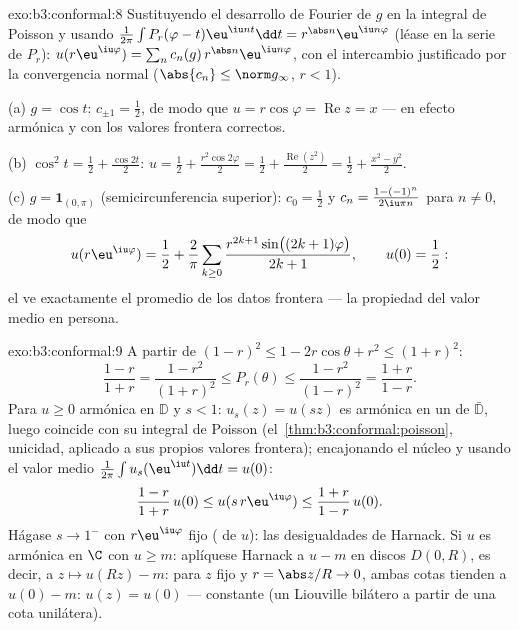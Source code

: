 \begin{solution}{exo:b3:conformal:8}
Sustituyendo el desarrollo de Fourier de $g$ en la integral de Poisson y
usando $\frac1{2\pi}\int P_r(\varphi - t)\eu^{\iu nt}\dd t =
r^{\abs n}\eu^{\iu n\varphi}$ (léase en la serie de $P_r$):
$u(r\eu^{\iu\varphi}) = \sum_nc_n(g)\,r^{\abs
n}\eu^{\iu n\varphi}$, con el intercambio justificado por la
convergencia normal ($\abs{c_n} \leq \norm g_\infty$, $r < 1$).

(a) $g = \cos t$: $c_{\pm1} = \frac12$, de modo que $u =
r\cos\varphi = \operatorname{Re}z = x$ --- en efecto armónica y con los
valores frontera correctos.

(b) $\cos^2t = \frac12 + \frac{\cos 2t}2$: $u = \frac12 +
\frac{r^2\cos2\varphi}2 = \frac12 +
\frac{\operatorname{Re}(z^2)}2 = \frac12 + \frac{x^2 -
y^2}{2}$.

(c) $g = \mathbf 1_{(0,\pi)}$ (semicircunferencia superior): $c_0 =
\frac12$ y $c_n = \frac{1 - (-1)^n}{2\iu\pi n}$ para $n \neq
0$, de modo que
\[
u(r\eu^{\iu\varphi}) = \frac12 + \frac2\pi\sum_{k\geq0}
\frac{r^{2k+1}\sin\bigl((2k+1)\varphi\bigr)}{2k + 1},
\qquad u(0) = \frac12 :
\]
el  ve exactamente el promedio de
los datos frontera --- la propiedad del valor medio en persona.
\end{solution}

\begin{solution}{exo:b3:conformal:9}
A partir de $(1-r)^2 \leq 1 - 2r\cos\theta + r^2 \leq (1+r)^2$:
\[
\frac{1-r}{1+r} = \frac{1 - r^2}{(1+r)^2} \leq P_r(\theta)
\leq \frac{1 - r^2}{(1 - r)^2} = \frac{1+r}{1-r} .
\]
Para $u \geq 0$ armónica en $\mathbb D$ y $s < 1$: $u_s(z) =
u(sz)$ es armónica en un  de
$\bar{\mathbb D}$, luego coincide con su integral de Poisson
(el~\cref{thm:b3:conformal:poisson}, unicidad, aplicado a sus propios
valores frontera); encajonando el núcleo y usando el valor medio
$\frac1{2\pi}\int u_s(\eu^{\iu t})\dd t = u(0)$:
\[
\frac{1-r}{1+r}\,u(0) \leq u(s\,r\eu^{\iu\varphi}) \leq
\frac{1+r}{1-r}\,u(0).
\]
Hágase $s \to 1^-$ con $r\eu^{\iu\varphi}$ fijo
( de $u$): las
desigualdades de Harnack. Si $u$ es armónica en $\C$ con $u \geq m$:
aplíquese Harnack a $u - m$ en discos $D(0, R)$, es decir, a
$z \mapsto u(Rz) - m$: para $z$ fijo y $r =
\abs z/R \to 0$, ambas cotas tienden a $u(0) - m$: $u(z) =
u(0)$ --- constante (un Liouville bilátero a partir de una cota
unilátera).
\end{solution}

